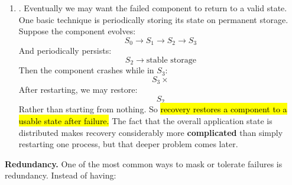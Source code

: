 \begin{enumerate}
        \begin{examplebox}
            Suppose a distributed service normally provides:
            \begin{equation*}
                \{A,B,C,D\}
            \end{equation*}
            But one component fails.
            Perhaps the system can continue providing:
            \begin{equation*}
                \{A,B,C\}
            \end{equation*}
            While temporarily losing functionality $D$.
        \end{examplebox}

        Fault tolerance is based on \textbf{degraded service}, because \hl{reduced functionality is preferable to complete failure.} The system may not be able to provide everything, but it can still provide something.

    \item {}. Eventually we may want the failed component to return to a valid state. One basic technique is periodically storing its state on permanent storage. Suppose the component evolves:
        \begin{equation*}
            S_0\rightarrow S_1\rightarrow S_2\rightarrow S_3
        \end{equation*}
        And periodically persists:
        \begin{equation*}
            S_2
            \rightarrow
            \boxed{\text{stable storage}}
        \end{equation*}
        Then the component crashes while in $S_3$:
        \begin{equation*}
            S_3\times
        \end{equation*}
        After restarting, we may restore:
        \begin{equation*}
            \boxed{S_2}
        \end{equation*}
        Rather than starting from nothing. So \hl{recovery restores a component to a usable state after failure.} The fact that the overall application state is distributed makes recovery considerably more \textbf{complicated} than simply restarting one process, but that deeper problem comes later.
\end{enumerate}
\textcolor{Green3}{ \textbf{Redundancy.}} One of the most common ways to mask or tolerate failures is redundancy. Instead of having:
